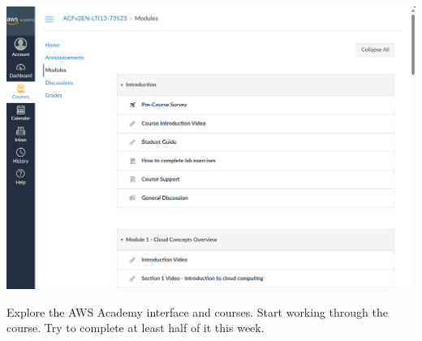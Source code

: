 \vspace{4mm}
\noindent
\includegraphics[width=\textwidth]{images/modules}
\vspace{2mm}

\noindent
Explore the AWS Academy interface and courses.
Start working through the  course.
Try to complete at least half of it this week.
